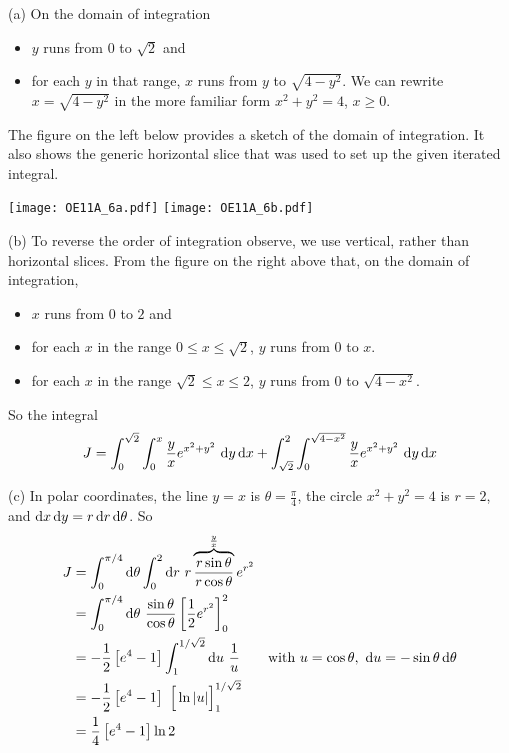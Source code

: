 \begin{solution}
(a)
On the domain of integration
\begin{itemize}
\item 
  $y$ runs from $0$ to $\sqrt{2}$ and
\item
  for each $y$ in that range, $x$ runs from $y$ to $\sqrt{4-y^2}$.
  We can rewrite $x=\sqrt{4-y^2}$ in the more familiar form $x^2+y^2=4$,
  $x\ge 0$.
\end{itemize}
The figure on the left below provides a sketch of the domain of integration.
It also shows the generic horizontal slice that was used to set up the given 
iterated integral.

\begin{center}
     \texttt{[image: OE11A\_6a.pdf]}\quad
     \texttt{[image: OE11A\_6b.pdf]}
\end{center}


(b)
To reverse the order of integration observe, we use vertical, rather than
horizontal slices. From the figure on the
right above that, on the domain of integration,
\begin{itemize}
\item 
  $x$ runs from $0$ to $2$ and
\item
  for each $x$ in the range $0\le x\le\sqrt{2}$, $y$ runs from $0$ 
  to $x$.
\item
  for each $x$ in the range $\sqrt{2}\le x\le 2$, $y$ runs from $0$ 
  to $\sqrt{4-x^2}$.
\end{itemize}
So the integral
\begin{equation*}
J = \int_0^{\sqrt{2}}\int_0^x \frac{y}{x}  e^{x^2+y^2}\ \dee{y}\,\dee{x}
   + \int_{\sqrt{2}}^2\int_0^{\sqrt{4-x^2}} \frac{y}{x}  e^{x^2+y^2}\ \dee{y}\,\dee{x}
\end{equation*}

(c) In polar coordinates, the line $y=x$ is $\theta=\frac{\pi}{4}$,
the circle $x^2+y^2=4$ is $r=2$, and 
$\mathrm{d}x\,\mathrm{d}y=r\,\mathrm{d}r\,\mathrm{d}\theta$. So
\begin{align*}
J&=\int_0^{\pi/4}\dee{\theta}\int_0^2\dee{r}\ r
         \overbrace{\frac{r\sin\theta}{r\cos\theta}}^{\frac{y}{x}}e^{r^2} \\
 &=\int_0^{\pi/4}\dee{\theta}\ \frac{\sin\theta}{\cos\theta}
           \left[\frac{1}{2} e^{r^2}\right]_0^2 \\
 &=-\frac{1}{2}\left[e^4-1\right] \int_1^{1/\sqrt{2}}\dee{u}\ \frac{1}{u}
   \qquad\text{with }u=\cos\theta,\ \dee{u}=-\sin\theta\,\dee{\theta} \\
 &=-\frac{1}{2}\left[e^4-1\right]\ \Big[\ln|u|\Big]_1^{1/\sqrt{2}} \\
 &= \frac{1}{4}\left[e^4-1\right]\ln 2
\end{align*}
\end{solution}

